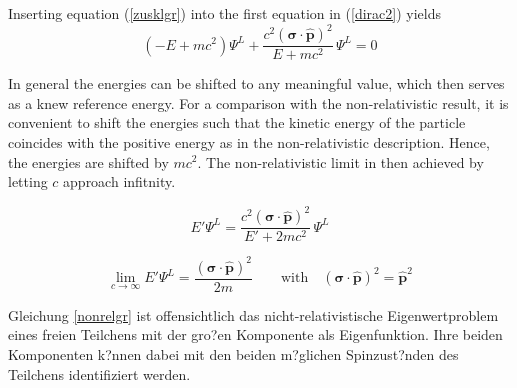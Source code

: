 Inserting equation (\ref{zusklgr}) into the first equation in (\ref{dirac2})
yields
\begin{equation}
(-E+mc^2)\Psi^L + \frac{c^2(\mathbf{\sigma}\cdot\hat{\mathbf{p}})^2}{E+mc^2}\,\Psi^L = 0
\end{equation}

In general the energies can be shifted to any meaningful value, which then
serves as a knew reference energy. For a comparison with the non-relativistic result,
it is convenient to shift the energies such
that the kinetic energy of the particle coincides with the positive energy as
in the non-relativistic description. Hence, the energies are shifted by $mc^2$.
The non-relativistic limit in then achieved by letting $c$ approach infitnity.

\begin{equation}
E'\Psi^L = \frac{c^2(\mathbf{\sigma}\cdot\hat{\mathbf{p}})^2}{E'+2mc^2}\,\Psi^L\label{hamneu}
\end{equation}

\begin{equation}
\lim_{c\rightarrow\infty} E'\Psi^L = \frac{(\mathbf{\sigma}\cdot\hat{\mathbf{p}})^2}{2m} \qquad\text{with}\quad (\mathbf{\sigma}\cdot\hat{\mathbf{p}})^2=\hat{\mathbf{p}}^2\label{nonrelgr}
\end{equation}

Gleichung \ref{nonrelgr} ist offensichtlich das nicht-relativistische Eigenwertproblem eines freien Teilchens mit der gro?en Komponente als Eigenfunktion. Ihre beiden Komponenten k?nnen dabei mit den beiden m?glichen Spinzust?nden des Teilchens identifiziert werden.

